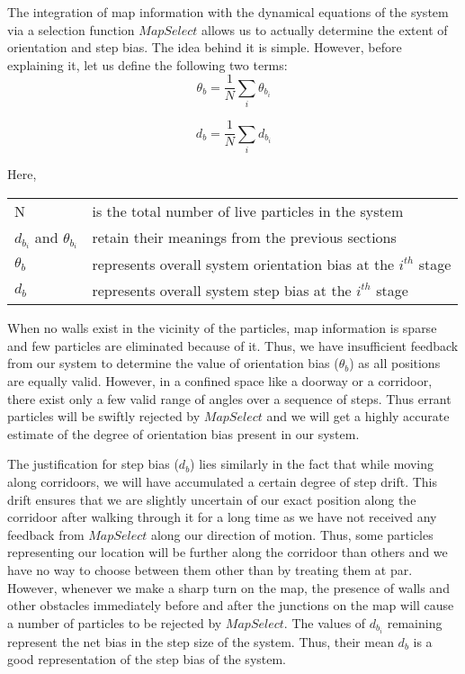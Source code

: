 \documentclass[10pt,journal,letterpaper,compsoc]{IEEEtran}
\begin{document}
The integration of map information with the dynamical equations of the system 
via a selection function $MapSelect$ allows us to actually determine 
the extent of orientation and step bias. The idea behind it is simple. 
However, before explaining it, let us define the following two terms:
\begin{equation}
\displaystyle
\theta_b = \frac{1}{N}\sum\limits_{i} \theta_{b_i}
\end{equation}

\begin{equation}
\displaystyle
d_b = \frac{1}{N}\sum\limits_{i} d_{b_i}
\end{equation}

Here,\\
\begin{tabular}{p{1.5in} p{3.5in}}
N & is the total number of live particles in the system \\
$d_{b_i}$ and $\theta_{b_i}$ & retain their meanings from the previous sections \\
$\theta_b$ & represents overall system orientation bias at the $i^{th}$ stage \\
$d_b$ & represents overall system step bias at the $i^{th}$ stage \\
\end{tabular}

When no walls exist in the vicinity of the particles, map information is sparse
and few particles are eliminated because of it. Thus, we have insufficient 
feedback from our system to determine the value of orientation bias ($\theta_b$)
as all positions are equally valid. However, in a confined space like a 
doorway or a corridoor, there exist only a few valid range of angles over 
a sequence of steps. Thus
errant particles will be swiftly rejected by $MapSelect$ and we will 
get a highly accurate estimate of the degree of orientation bias present 
in our system.

The justification for step bias ($d_b$) lies similarly in the fact that while
moving along corridoors, we will have accumulated
a certain degree of step drift. This drift ensures that we are slightly 
uncertain of our exact position along the corridoor after walking through it for a long time
as we have not received any feedback from $MapSelect$ along our direction of motion. 
Thus,
some particles representing our location will be further along the corridoor than others and we have no way 
to choose between them other than by treating them at par. However, 
whenever we make a sharp turn on the map, the presence of walls and other 
obstacles immediately before and after the junctions on the map will cause 
a number of particles to be rejected by $MapSelect$. The values of $d_{b_i}$
remaining represent the net bias in the step size of the system. Thus,
their mean $d_b$ is a good representation of the step bias of the system.
\end{document}
